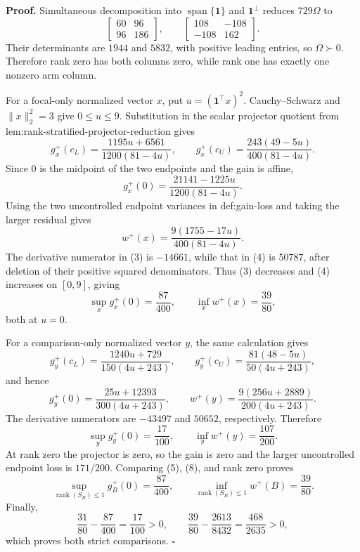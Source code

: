 \textbf{Proof.}
Simultaneous decomposition into \(\operatorname{span}\{\mathbf1\}\) and \(\mathbf1^\perp\) reduces \(729\Omega\) to
\[
\begin{bmatrix}60&96\\96&186\end{bmatrix},
\qquad
\begin{bmatrix}108&-108\\-108&162\end{bmatrix}.
\tag{1}
\]
Their determinants are \(1944\) and \(5832\), with positive leading entries, so \(\Omega\succ0\).  Therefore rank zero has both columns zero, while rank one has exactly one nonzero arm column.

For a focal-only normalized vector \(x\), put \(u=(\mathbf1^{\top}x)^2\).  Cauchy--Schwarz and \(\lVert x\rVert_2^2=3\) give \(0\le u\le9\).  Substitution in the scalar projector quotient from lem:rank-stratified-projector-reduction gives
\[
g_x^+(c_L)=\frac{1195u+6561}{1200(81-4u)},
\qquad
g_x^+(c_U)=\frac{243(49-5u)}{400(81-4u)}.
\tag{2}
\]
Since \(0\) is the midpoint of the two endpoints and the gain is affine,
\[
g_x^+(0)=\frac{21141-1225u}{1200(81-4u)}.
\tag{3}
\]
Using the two uncontrolled endpoint variances in def:gain-loss and taking the larger residual gives
\[
w^+(x)=\frac{9(1755-17u)}{400(81-4u)}.
\tag{4}
\]
The derivative numerator in (3) is \(-14661\), while that in (4) is \(50787\), after deletion of their positive squared denominators.  Thus (3) decreases and (4) increases on \([0,9]\), giving
\[
\sup_xg_x^+(0)=\frac{87}{400},
\qquad
\inf_xw^+(x)=\frac{39}{80},
\tag{5}
\]
both at \(u=0\).

For a comparison-only normalized vector \(y\), the same calculation gives
\[
g_y^+(c_L)=\frac{1240u+729}{150(4u+243)},
\qquad
g_y^+(c_U)=\frac{81(48-5u)}{50(4u+243)},
\tag{6}
\]
and hence
\[
g_y^+(0)=\frac{25u+12393}{300(4u+243)},
\qquad
w^+(y)=\frac{9(256u+2889)}{200(4u+243)}.
\tag{7}
\]
The derivative numerators are \(-43497\) and \(50652\), respectively.  Therefore
\[
\sup_yg_y^+(0)=\frac{17}{100},
\qquad
\inf_yw^+(y)=\frac{107}{200}.
\tag{8}
\]
At rank zero the projector is zero, so the gain is zero and the larger uncontrolled endpoint loss is \(171/200\).  Comparing (5), (8), and rank zero proves
\[
\sup_{\operatorname{rank}(S_B)\le1}g_B^+(0)=\frac{87}{400},
\qquad
\inf_{\operatorname{rank}(S_B)\le1}w^+(B)=\frac{39}{80}.
\]
Finally,
\[
\frac{31}{80}-\frac{87}{400}=\frac{17}{100}>0,
\qquad
\frac{39}{80}-\frac{2613}{8432}=\frac{468}{2635}>0,
\]
which proves both strict comparisons.  \(\square\)